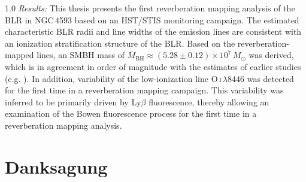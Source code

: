 \documentclass[a4paper,12pt,twoside]{report}
\begin{document}
\begin{spacing}{1.0}
\textit{Results:} This thesis presents the first reverberation mapping analysis of the BLR in NGC\,4593 based on an HST/STIS monitoring campaign. The estimated characteristic BLR radii and line widths of the emission lines are consistent with an ionization stratification structure of the BLR. Based on the reverberation-mapped lines, an SMBH mass of $\bar{M}_{\mathrm{BH}} \approx (5.28 \pm 0.12)\times 10^{7}\,M_\odot$ was derived, which is in agreement in order of magnitude with the estimates of earlier studies (e.g. \cite{kollatschny1997balmer, denney2006ngc4593}). In addition, variability of the low-ionization line O\,\textsc{i}\,$\lambda 8446$ was detected for the first time in a reverberation mapping campaign. This variability was inferred to be primarily driven by Ly$\beta$ fluorescence, thereby allowing an examination of the Bowen fluorescence process for the first time in a reverberation mapping analysis.
\end{spacing}
	

	\cleardoublepage
		

	\tableofcontents
	\cleardoublepage
	
	\listoffigures
	\listoftables
	\cleardoublepage
	
	\pagestyle{fancy}
	\renewcommand{\chaptermark}[1]{\markboth{\thechapter.\ #1}{}}
	\renewcommand{\sectionmark}[1]{\markright{\thesection.\ #1}}
	\setcounter{page}{1}
	
	
	
	
	
	
	
	\printbibliography
	\appendix
	
	\clearpage
	\chapter*{Danksagung}  %
	
\end{document}
